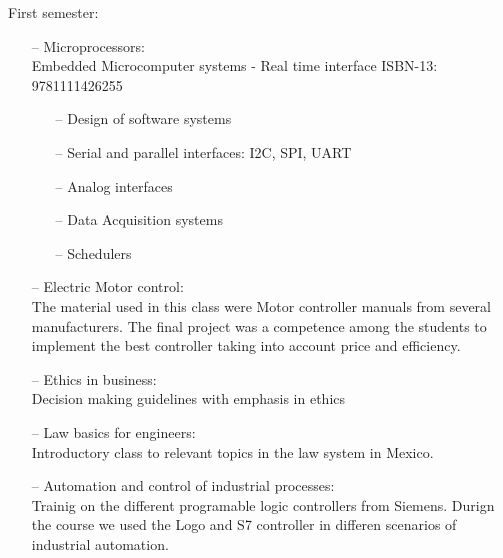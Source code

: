 \documentclass{article}
\begin{document}
First semester:
    \begin{itemize}
     \setlength\itemsep{0pt}
        \item[--] Microprocessors:\\
            Embedded Microcomputer systems - Real time interface
                ISBN-13: 9781111426255
            \begin{itemize}
     \setlength\itemsep{0pt}
            \item[--] Design of software systems
            \item[--] Serial and parallel interfaces: I2C, SPI, UART
            \item[--] Analog interfaces
            \item[--] Data Acquisition systems
            \item[--] Schedulers
            \end{itemize}
        \item[--] Electric Motor control: \\
        The material used in this class were Motor controller manuals from several manufacturers.
        The final project was a competence among the students to implement the best controller
        taking into account price and efficiency.

        \item[--] Ethics in business:\\
        Decision making guidelines with emphasis in ethics

        \item[--] Law basics for engineers:\\
        Introductory class to relevant topics in the law system in Mexico.

        \item[--] Automation and control of industrial processes:\\
            Trainig on the different programable logic controllers from Siemens.
            Durign the course we used the Logo and S7 controller in differen scenarios of
            industrial automation.
    \end{itemize}
\end{document}
